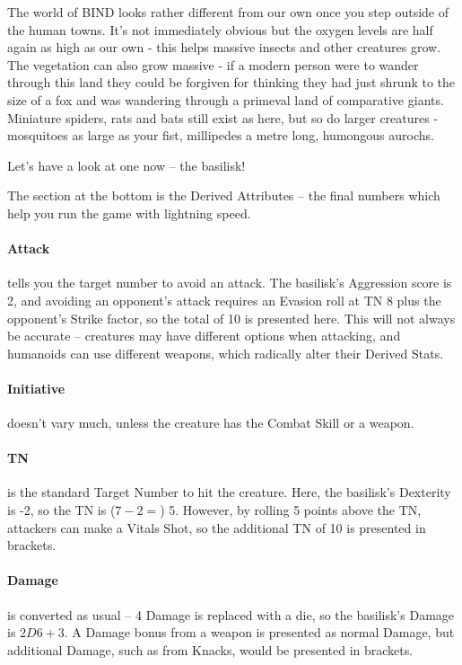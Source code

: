\begin{multicols}{2}

The world of BIND looks rather different from our own once you step outside of the human towns.  It's not immediately obvious but the oxygen levels are half again as high as our own - this helps massive insects and other creatures grow.  The vegetation can also grow massive - if a modern person were to wander through this land they could be forgiven for thinking they had just shrunk to the size of a fox and was wandering through a primeval land of comparative giants.  Miniature spiders, rats and bats still exist as here, but so do larger creatures  - mosquitoes as large as your fist, millipedes a metre long, humongous aurochs.

Let's have a look at one now -- the basilisk!

\basilisk

The section at the bottom is the Derived Attributes -- the final numbers which help you run the game with lightning speed.

\paragraph{Attack} tells you the target number to avoid an attack.  The basilisk's Aggression score is 2, and avoiding an opponent's attack requires an Evasion roll at TN 8 plus the opponent's Strike factor, so the total of 10 is presented here.  This will not always be accurate -- creatures may have different options when attacking, and humanoids can use different weapons, which radically alter their Derived Stats.

\paragraph{Initiative} doesn't vary much, unless the creature has the Combat Skill or a weapon.

\paragraph{TN} is the standard Target Number to hit the creature.  Here, the basilisk's Dexterity is -2, so the TN is ($7 - 2 =$) 5.  However, by rolling 5 points above the TN, attackers can make a Vitals Shot, so the additional TN of 10 is presented in brackets.

\paragraph{Damage} is converted as usual -- 4 Damage is replaced with a die, so the basilisk's Damage is $2D6+3$.  A Damage bonus from a weapon is presented as normal Damage, but additional Damage, such as from Knacks, would be presented in brackets.


\end{multicols}
